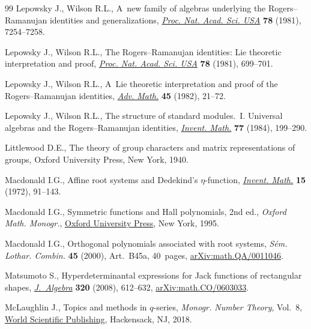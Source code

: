 \documentclass[pdftex]{sigma}
\numberwithin{equation}{section}
\begin{document}
\begin{thebibliography}{99}
Lepowsky J., Wilson R.L., A~new family of algebras underlying the
 {R}ogers--{R}amanujan identities and generalizations,
 \href{https://doi.org/10.1073/pnas.78.12.7254}{\textit{Proc. Nat. Acad. Sci.
 {USA}}} \textbf{78} (1981), 7254--7258.

Lepowsky J., Wilson R.L., The {R}ogers--{R}amanujan identities: {L}ie theoretic
 interpretation and proof,
 \href{https://doi.org/10.1073/pnas.78.2.699}{\textit{Proc. Nat. Acad. Sci.
 USA}} \textbf{78} (1981), 699--701.

Lepowsky J., Wilson R.L., A~{L}ie theoretic interpretation and proof of the
 {R}ogers--{R}amanujan identities,
 \href{https://doi.org/10.1016/S0001-8708(82)80012-1}{\textit{Adv. Math.}}
 \textbf{45} (1982), 21--72.

Lepowsky J., Wilson R.L., The structure of standard modules.~{I}. {U}niversal
 algebras and the {R}ogers--{R}amanujan identities,
 \href{https://doi.org/10.1007/BF01388447}{\textit{Invent. Math.}} \textbf{77}
 (1984), 199--290.

Littlewood D.E., The theory of group characters and matrix representations of
 groups, Oxford University Press, New York, 1940.

Macdonald I.G., Affine root systems and {D}edekind's {$\eta $}-function,
 \href{https://doi.org/10.1007/BF01418931}{\textit{Invent. Math.}} \textbf{15}
 (1972), 91--143.

Macdonald I.G., Symmetric functions and {H}all polynomials, 2nd ed., \textit{Oxford Math. Monogr.},
 \href{https://doi.org/10.1093/oso/9780198534891.001.0001}{Oxford University
 Press}, New York, 1995.

Macdonald I.G., Orthogonal polynomials associated with root systems,
 \textit{S\'em. Lothar. Combin.} \textbf{45} (2000), Art.~B45a, 40~pages,
 \href{http://arxiv.org/abs/math.QA/0011046}{arXiv:math.QA/0011046}.

Matsumoto S., Hyperdeterminantal expressions for {J}ack functions of
 rectangular shapes,
 \href{https://doi.org/10.1016/j.jalgebra.2007.09.013}{\textit{J.~Algebra}}
 \textbf{320} (2008), 612--632,
 \href{http://arxiv.org/abs/math.CO/0603033}{arXiv:math.CO/0603033}.

McLaughlin J., Topics and methods in {$q$}-series, \textit{Monogr. Number
 Theory}, Vol.~8, \href{https://doi.org/10.1142/10528}{World Scientific
 Publishing}, Hackensack, NJ, 2018.


\end{thebibliography}
\end{document}
